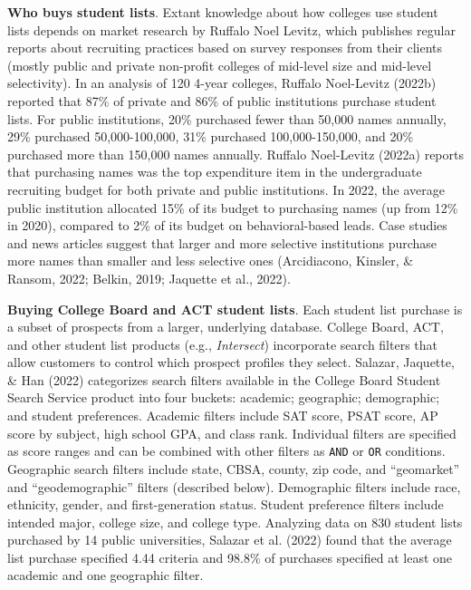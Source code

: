 \documentclass[
  12pt,
]{article}
\begin{document}
\textbf{Who buys student lists}. Extant knowledge about how colleges use student lists depends on market research by Ruffalo Noel Levitz, which publishes regular reports about recruiting practices based on survey responses from their clients (mostly public and private non-profit colleges of mid-level size and mid-level selectivity). In an analysis of 120 4-year colleges, Ruffalo Noel-Levitz (2022b) reported that 87\% of private and 86\% of public institutions purchase student lists. For public institutions, 20\% purchased fewer than 50,000 names annually, 29\% purchased 50,000-100,000, 31\% purchased 100,000-150,000, and 20\% purchased more than 150,000 names annually. Ruffalo Noel-Levitz (2022a) reports that purchasing names was the top expenditure item in the undergraduate recruiting budget for both private and public institutions. In 2022, the average public institution allocated 15\% of its budget to purchasing names (up from 12\% in 2020), compared to 2\% of its budget on behavioral-based leads. Case studies and news articles suggest that larger and more selective institutions purchase more names than smaller and less selective ones (Arcidiacono, Kinsler, \& Ransom, 2022; Belkin, 2019; Jaquette et al., 2022).

\textbf{Buying College Board and ACT student lists}. Each student list purchase is a subset of prospects from a larger, underlying database. College Board, ACT, and other student list products (e.g., \emph{Intersect}) incorporate search filters that allow customers to control which prospect profiles they select. Salazar, Jaquette, \& Han (2022) categorizes search filters available in the College Board Student Search Service product into four buckets: academic; geographic; demographic; and student preferences. Academic filters include SAT score, PSAT score, AP score by subject, high school GPA, and class rank. Individual filters are specified as score ranges and can be combined with other filters as \texttt{AND} or \texttt{OR} conditions. Geographic search filters include state, CBSA, county, zip code, and ``geomarket'' and ``geodemographic'' filters (described below). Demographic filters include race, ethnicity, gender, and first-generation status. Student preference filters include intended major, college size, and college type. Analyzing data on 830 student lists purchased by 14 public universities, Salazar et al. (2022) found that the average list purchase specified 4.44 criteria and 98.8\% of purchases specified at least one academic and one geographic filter.
\end{document}
